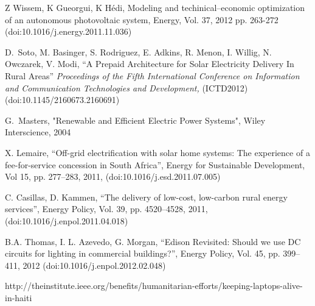 \documentclass[conference]{IEEEtran}
\begin{document}



\begin{thebibliography}{1}

Z Wissem, K Gueorgui, K H\'edi,
Modeling and techinical--economic optimization of an autonomous
photovoltaic system,
Energy, Vol. 37, 2012 pp. 263-272
(doi:10.1016/j.energy.2011.11.036)

D.~Soto, M. Basinger, S. Rodriguez, E. Adkins, R. Menon,
I. Willig, N. Owczarek, V. Modi,
``A Prepaid Architecture for Solar Electricity Delivery In Rural Areas''
\textit{Proceedings of the Fifth International Conference on Information
and Communication Technologies and Development,}
(ICTD2012)
(doi:10.1145/2160673.2160691)

G.~Masters,
"Renewable and Efficient Electric Power Systems",
Wiley Interscience,
2004

X. Lemaire,
``Off-grid electrification with solar home systems:
The experience of a fee-for-service concession in South Africa'',
Energy for Sustainable Development,
Vol 15, pp. 277--283, 2011,
(doi:10.1016/j.esd.2011.07.005)

C. Casillas, D. Kammen,
``The delivery of low-cost, low-carbon rural energy services'',
Energy Policy,
Vol. 39, pp. 4520--4528, 2011,
(doi:10.1016/j.enpol.2011.04.018)

B.A. Thomas, I. L. Azevedo, G. Morgan,
``Edison Revisited:
Should we use DC circuits for lighting in commercial buildings?'',
Energy Policy,
Vol. 45, pp. 399--411, 2012
(doi:10.1016/j.enpol.2012.02.048)

http://theinstitute.ieee.org/benefits/humanitarian-efforts/keeping-laptops-alive-in-haiti
\end{thebibliography}
\end{document}
